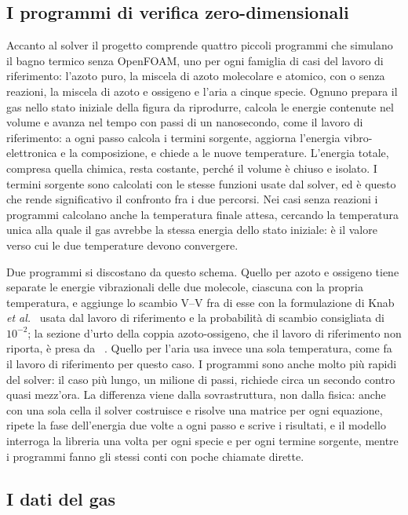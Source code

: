 \subsection{I programmi di verifica zero-dimensionali}
\label{sec:programmi0D}

Accanto al solver il progetto comprende quattro piccoli programmi che simulano
il bagno termico senza OpenFOAM, uno per ogni famiglia di casi del lavoro di
riferimento: l'azoto puro, la miscela di azoto molecolare e atomico, con o
senza reazioni, la miscela di azoto e ossigeno e l'aria a cinque specie.
Ognuno prepara il gas nello stato iniziale della figura da riprodurre, calcola
le energie contenute nel volume e avanza nel tempo con passi di un
nanosecondo, come il lavoro di riferimento: a ogni passo calcola i termini
sorgente, aggiorna l'energia vibro-elettronica e la composizione, e chiede a
\mpp{} le nuove temperature. L'energia totale, compresa quella chimica, resta
costante, perché il volume è chiuso e isolato. I termini sorgente sono
calcolati con le stesse funzioni usate dal solver, ed è questo che rende
significativo il confronto fra i due percorsi. Nei casi senza reazioni i
programmi calcolano anche la temperatura finale attesa, cercando la
temperatura unica alla quale il gas avrebbe la stessa energia dello stato
iniziale: è il valore verso cui le due temperature devono convergere.

Due programmi si discostano da questo schema. Quello per azoto e ossigeno tiene
separate le energie vibrazionali delle due molecole, ciascuna con la propria
temperatura, e aggiunge lo scambio V--V fra di esse con la formulazione di
Knab \textit{et al.}~\cite{knab1995} usata dal lavoro di riferimento e la
probabilità di scambio consigliata di $10^{-2}$; la sezione d'urto della coppia
azoto-ossigeno, che il lavoro di riferimento non riporta, è presa da
\hyfoam~\cite{hystrath}. Quello per l'aria usa invece una sola temperatura,
come fa il lavoro di riferimento per questo caso. I programmi sono anche molto
più rapidi del solver: il caso più lungo, un milione di passi, richiede circa
un secondo contro quasi mezz'ora. La differenza viene dalla sovrastruttura, non dalla
fisica: anche con una sola cella il solver costruisce e risolve una matrice per ogni
equazione, ripete la fase dell'energia due volte a ogni passo e scrive i
risultati, e il modello interroga la libreria una volta per ogni specie e per
ogni termine sorgente, mentre i programmi fanno gli stessi conti con poche
chiamate dirette.

\subsection{I dati del gas}
\label{sec:dati}


